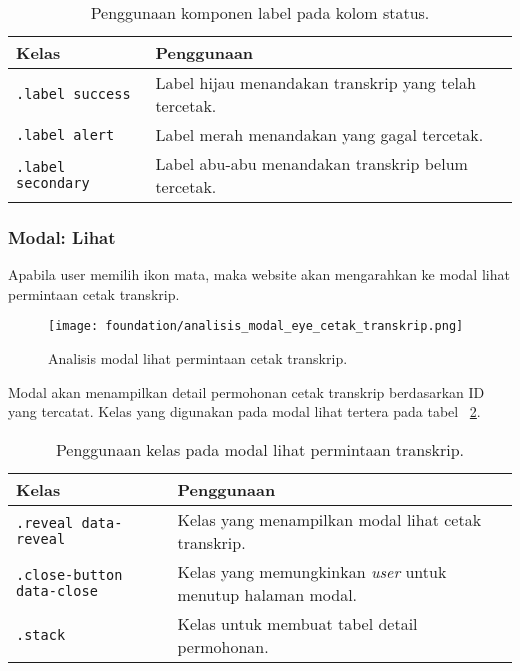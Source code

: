 \begin{table}[H]
	\centering
	\caption{Penggunaan komponen label pada kolom status.}
	\begin{tabularx}{\textwidth}{lX}
		\toprule
		Kelas & Penggunaan \\
		\midrule
		\texttt{.label success} & Label hijau menandakan transkrip yang telah tercetak.\\
		\texttt{.label alert} & Label merah menandakan yang gagal tercetak.\\
		\texttt{.label secondary} & Label abu-abu menandakan transkrip belum tercetak.\\
		\bottomrule
	\end{tabularx}%
	\label{table:labelCetakTranskrip}
\end{table}%

\subsubsection{Modal: Lihat}
Apabila user memilih ikon mata, maka website akan mengarahkan ke modal lihat permintaan cetak transkrip. \\
\begin{figure} [H]
	\centering  
	\texttt{[image: foundation/analisis\_modal\_eye\_cetak\_transkrip.png]}  
	\caption{Analisis modal lihat permintaan cetak transkrip.} 
	\label{fig:analisisModalLihatPermintaanCetakTranskrip}
\end{figure}

Modal akan menampilkan detail permohonan cetak transkrip berdasarkan ID yang tercatat. Kelas yang digunakan pada modal lihat tertera pada tabel ~\ref{table:analisisModalLihatPermintaanCetakTranskrip}. \\

\begin{table}[H]
	\centering
	\caption{Penggunaan kelas pada modal lihat permintaan transkrip.}
	\begin{tabularx}{\textwidth}{lX}
		\toprule
		Kelas & Penggunaan \\
		\midrule
		\texttt{.reveal data-reveal} & Kelas yang menampilkan modal lihat cetak transkrip. \\
		\texttt{.close-button data-close} & Kelas yang memungkinkan \textit{user} untuk menutup halaman modal.\\
		\texttt{.stack} & Kelas untuk membuat tabel detail permohonan.\\
		\bottomrule
	\end{tabularx}%
	\label{table:analisisModalLihatPermintaanCetakTranskrip}
\end{table}%

